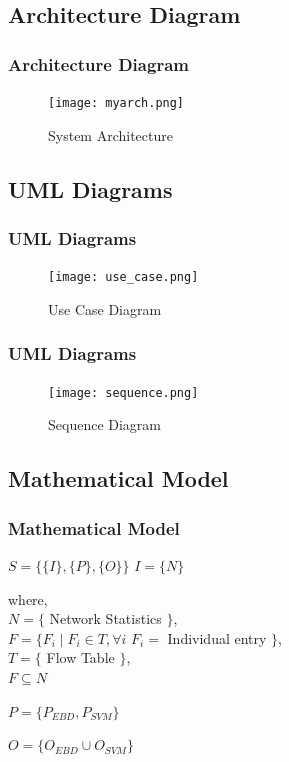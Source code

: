 \documentclass[10pt]{beamer}
\begin{document}
\begin{frame}
\section[]{Architecture Diagram}
\frametitle{Architecture Diagram}
\begin{figure}[H]
\texttt{[image: myarch.png]}
\caption{\footnotesize System Architecture}
\end{figure}
\end{frame}


\begin{frame}
\section[]{UML Diagrams}
\frametitle{UML Diagrams}
\begin{figure}
\texttt{[image: use\_case.png]}
\caption{\footnotesize Use Case Diagram}
\end{figure}
\end{frame}

\begin{frame}
\frametitle{UML Diagrams}
\begin{figure}
\texttt{[image: sequence.png]}
\caption{\footnotesize Sequence Diagram}
\end{figure}
\end{frame}


\begin{frame}
\section[]{Mathematical Model}
\frametitle{Mathematical Model}
\footnotesize
$S = \lbrace \lbrace I \rbrace ,\lbrace P \rbrace ,\lbrace O \rbrace \rbrace $\newline\newline
$I = \lbrace N \rbrace$

\noindent
where,\\
$N = \lbrace $ Network Statistics $ \rbrace $, \\
$F =\lbrace F_{i} \mid F_{i} \in T , \forall i$ $ F_{i} =$ Individual entry $ \rbrace$, \\
$T = \lbrace $ Flow Table $ \rbrace$, \\
$F \subseteq N$
\newline

$P = \lbrace P_{EBD}, P_{SVM} \rbrace$
\newline

$O = \lbrace O_{EBD} \cup O_{SVM} \rbrace$

\end{frame}
\end{document}
